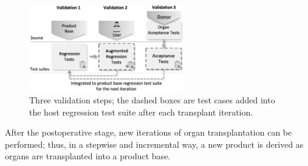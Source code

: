 \begin{figure}[t]
\centering \includegraphics[width=0.6\textwidth]{images/postoperative_tests2.png}
\caption{Three validation steps; the dashed boxes are test cases added into the host regression test suite after each transplant iteration.}
\label{fig:postoperative_tests}
\end{figure} 

After the postoperative stage, new iterations of organ transplantation can be performed; thus, in a stepwise and incremental way, a new product is derived as organs are transplanted into a product base. 

